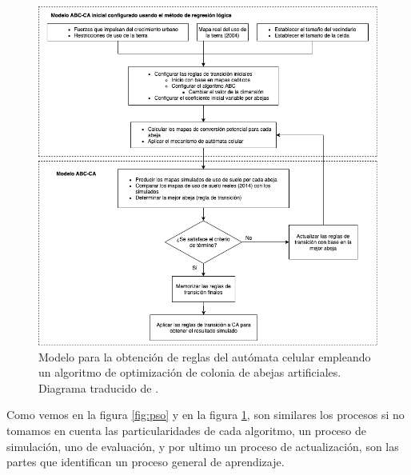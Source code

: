 \begin{figure}[H]
	\centering
	\includegraphics[width=\linewidth]{fig/abejas}
	\caption{Modelo para la obtención de reglas del autómata celular empleando un algoritmo de optimización de colonia de abejas artificiales. Diagrama traducido de \cite{naghibi2016discovery}.}
	\label{fig:abc}
\end{figure}

Como vemos en la figura \ref{fig:pso} y en la figura \ref{fig:abc}, son similares los procesos si no tomamos en cuenta las particularidades de cada algoritmo, un proceso de simulación, uno de evaluación, y por ultimo un proceso de actualización, son las partes que identifican un proceso general de aprendizaje.

